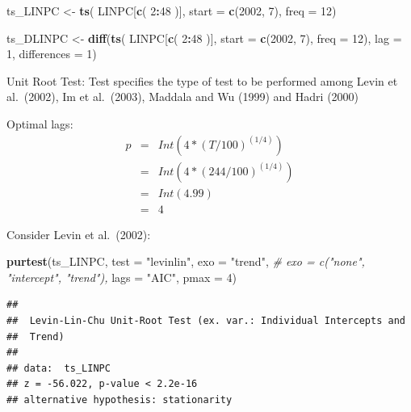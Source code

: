 \documentclass[
]{book}
\newenvironment{Shaded}{\begin{snugshade}}{\end{snugshade}}
\newcommand{\AttributeTok}[1]{\textcolor[rgb]{0.13,0.29,0.53}{#1}}
\newcommand{\CommentTok}[1]{\textcolor[rgb]{0.56,0.35,0.01}{\textit{#1}}}
\newcommand{\DecValTok}[1]{\textcolor[rgb]{0.00,0.00,0.81}{#1}}
\newcommand{\FunctionTok}[1]{\textcolor[rgb]{0.13,0.29,0.53}{\textbf{#1}}}
\newcommand{\NormalTok}[1]{#1}
\newcommand{\OtherTok}[1]{\textcolor[rgb]{0.56,0.35,0.01}{#1}}
\newcommand{\SpecialCharTok}[1]{\textcolor[rgb]{0.81,0.36,0.00}{\textbf{#1}}}
\newcommand{\StringTok}[1]{\textcolor[rgb]{0.31,0.60,0.02}{#1}}
\begin{document}
\begin{Shaded}
\begin{Highlighting}[]
\NormalTok{ts\_LINPC }\OtherTok{\textless{}{-}} \FunctionTok{ts}\NormalTok{( LINPC[}\FunctionTok{c}\NormalTok{( }\DecValTok{2}\SpecialCharTok{:}\DecValTok{48}\NormalTok{ )], }
               \AttributeTok{start =} \FunctionTok{c}\NormalTok{(}\DecValTok{2002}\NormalTok{, }\DecValTok{7}\NormalTok{),}
               \AttributeTok{freq =} \DecValTok{12}\NormalTok{)}

\NormalTok{ts\_DLINPC }\OtherTok{\textless{}{-}} \FunctionTok{diff}\NormalTok{(}\FunctionTok{ts}\NormalTok{( LINPC[}\FunctionTok{c}\NormalTok{( }\DecValTok{2}\SpecialCharTok{:}\DecValTok{48}\NormalTok{ )], }
                     \AttributeTok{start =} \FunctionTok{c}\NormalTok{(}\DecValTok{2002}\NormalTok{, }\DecValTok{7}\NormalTok{),}
                     \AttributeTok{freq =} \DecValTok{12}\NormalTok{), }
                  \AttributeTok{lag =} \DecValTok{1}\NormalTok{, }
                  \AttributeTok{differences =} \DecValTok{1}\NormalTok{)}
\end{Highlighting}
\end{Shaded}

Unit Root Test: Test specifies the type of test to be performed among Levin et al.~(2002), Im et al.~(2003), Maddala and Wu (1999) and Hadri (2000)

Optimal lags:
\begin{eqnarray*}
  p & = & Int(4*(T/100)^{(1/4)}) \\
   & = & Int(4*(244/100)^{(1/4)}) \\
   & = & Int(4.99) \\
   & = & 4
\end{eqnarray*}

Consider Levin et al.~(2002):

\begin{Shaded}
\begin{Highlighting}[]
\FunctionTok{purtest}\NormalTok{(ts\_LINPC, }\AttributeTok{test =} \StringTok{"levinlin"}\NormalTok{, }\AttributeTok{exo =} \StringTok{"trend"}\NormalTok{, }\CommentTok{\# exo = c("none", "intercept", "trend"),}
        \AttributeTok{lags =} \StringTok{"AIC"}\NormalTok{, }\AttributeTok{pmax =} \DecValTok{4}\NormalTok{)}
\end{Highlighting}
\end{Shaded}

\begin{verbatim}
## 
##  Levin-Lin-Chu Unit-Root Test (ex. var.: Individual Intercepts and
##  Trend)
## 
## data:  ts_LINPC
## z = -56.022, p-value < 2.2e-16
## alternative hypothesis: stationarity
\end{verbatim}
\end{document}
